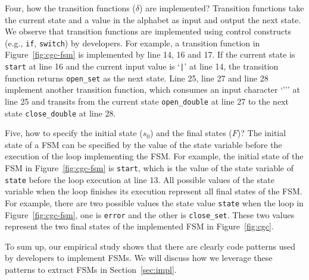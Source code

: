 Four, how the transition functions ($\delta$) are implemented?
Transition functions take the current state and a value
in the alphabet as input and output the next state. 
We observe that transition functions are implemented
using control constructs (e.g., \texttt{if}, \texttt{switch}) by developers. 
For example, a transition function in Figure~\ref{fig:cgc-fsm} 
is implemented by line 14, 16 and 17. 
If the current state is \texttt{start} at line 16 and the current input value is 
`\verb/|/’ at line 14, the transition function returns \texttt{open\_set}
as the next state. 
Line 25, line 27 and line 28 implement another transition function,
which consumes an input character `''' at line 25 and 
transits from the current state 
\texttt{open\_double} at line 27 to 
the next state \texttt{close\_double} at line 28. 




Five, how to specify the initial state ($s_0$) and the final states ($F$)? 
The initial state of a FSM can be specified 
by the value of the state variable before the 
execution of the loop implementing the FSM.
For example, the initial state of the FSM in Figure~\ref{fig:cgc-fsm}
is \texttt{start}, which is the value of the state variable of \texttt{state} 
before the loop execution at line 13. 
All possible values of the state variable when the loop finishes its execution 
represent all final states of the FSM. 
For example, there are two possible values the state value \texttt{state} when 
the loop in Figure~\ref{fig:cgc-fsm}, one is \texttt{error} and the other is \texttt{close\_set}.
These two values represent the two final states of the implemented FSM in Figure~\ref{fig:cgc}.

To sum up, our empirical study shows that 
there are clearly code patterns used by developers to implement FSMs. 
We will discuss how we leverage these patterns to extract 
FSMs in Section~\ref{sec:impl}.


